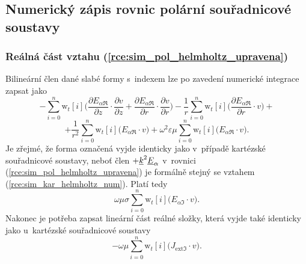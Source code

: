 \subsection{Numerický zápis rovnic polární souřadnicové soustavy}
\subsubsection*{Reálná část vztahu (\ref{rce:sim_pol_helmholtz_upravena})}
Bilineární člen dané slabé formy s~indexem  lze po zavedení numerické integrace zapsat jako
\begin{displaymath}
-\sum_{i=0}^{n}\mathrm{w}_{t}[i]\bigg(\frac{\partial E_{\alpha\Re}}{\partial z}\cdot \frac{\partial v}{\partial z} + \frac{\partial E_{\alpha\Re}}{\partial r}\cdot \frac{\partial v}{\partial r} \bigg) - \frac{1}{r}\sum_{i=0}^{n}\mathrm{w}_{t}[i]\bigg(\frac{\partial E_{\alpha\Re}}{\partial r}\cdot v\bigg) +
\end{displaymath}
\begin{equation}
	 + \frac{1}{r^{2}}\sum_{i=0}^{n}\mathrm{w}_{t}[i]\bigg(E_{\alpha\Re}\cdot v\bigg) + \omega^{2}\varepsilon\mu\sum_{i=0}^{n}\mathrm{w}_{t}[i]\bigg(E_{\alpha\Re}\cdot v\bigg).
	\label{rce:sim_pol_bilinear_real_real} 
\end{equation}
Je zřejmé, že forma označená  vyjde identicky jako v~případě kartézské souřadnicové soustavy, neboť člen $+{\underline{k}}^{2}{\underline{E}}_{\alpha}$ v~rovnici (\ref{rce:sim_pol_helmholtz_upravena}) je formálně stejný se vztahem (\ref{rce:sim_kar_helmholtz_num}). Platí tedy
\begin{equation}
 \omega\mu\sigma\sum_{i=0}^{n}\mathrm{w}_{t}[i]\bigg(E_{\alpha\Im}\cdot v\bigg).
	\label{rce:sim_pol_bilinear_real_imag} 
\end{equation}
Nakonec je potřeba zapsat lineární část reálné složky, která vyjde také identicky jako u~kartézské souřadnicové soustavy
\begin{equation}
 -\omega\mu\sum_{i=0}^{n}\mathrm{w}_{t}[i]\bigg(J_{\mathrm{ext}\Im}\cdot v\bigg).
	\label{rce:sim_pol_linear_real_num} 
\end{equation}


